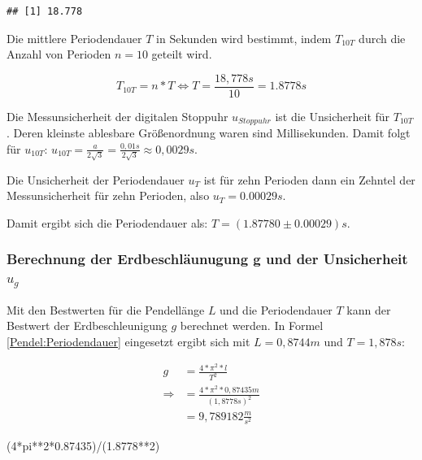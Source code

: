 \documentclass[
  9pt,
]{article}
\newenvironment{Shaded}{\begin{snugshade}}{\end{snugshade}}
\newcommand{\DecValTok}[1]{\textcolor[rgb]{0.00,0.00,0.81}{#1}}
\newcommand{\FloatTok}[1]{\textcolor[rgb]{0.00,0.00,0.81}{#1}}
\newcommand{\NormalTok}[1]{#1}
\newcommand{\SpecialCharTok}[1]{\textcolor[rgb]{0.00,0.00,0.00}{#1}}
\begin{document}
\begin{verbatim}
## [1] 18.778
\end{verbatim}

Die mittlere Periodendauer \(T\) in Sekunden wird bestimmt, indem
\(T_{10T}\) durch die Anzahl von Perioden \(n=10\) geteilt wird.

\[T_{10T} = n*T \Leftrightarrow T = \frac{18,778s}{10}=1.8778s\]

Die Messunsicherheit der digitalen Stoppuhr \(u_{Stoppuhr}\) ist die
Unsicherheit für \(T_{10T}\). Deren kleinste ablesbare Größenordnung
waren sind Millisekunden. Damit folgt für \(u_{10T}\):
\(u_{10T}= \frac{a}{2\sqrt{3}} = \frac{0,01s}{2\sqrt{3}} \approx 0,0029s\).

Die Unsicherheit der Periodendauer \(u_T\) ist für zehn Perioden dann
ein Zehntel der Messunsicherheit für zehn Perioden, also
\(u_T=0.00029s\).

Damit ergibt sich die Periodendauer als: \(T=(1.87780 \pm 0.00029)s\).

\hypertarget{berechnung-der-erdbeschluxe4unugung-g-und-der-unsicherheit-u_g}{%
\subsubsection{\texorpdfstring{Berechnung der Erdbeschläunugung g und
der Unsicherheit
\(u_g\)}{Berechnung der Erdbeschläunugung g und der Unsicherheit u\_g}}\label{berechnung-der-erdbeschluxe4unugung-g-und-der-unsicherheit-u_g}}

Mit den Bestwerten für die Pendellänge \(L\) und die Periodendauer \(T\)
kann der Bestwert der Erdbeschleunigung \(g\) berechnet werden. In
Formel \ref{Pendel:Periodendauer} eingesetzt ergibt sich mit
\(L = 0,8744m\) und \(T = 1,878s\):

\begin{equation*}
\begin{split}
g&=\frac{4*\pi^2*l}{T^2}\\
\Rightarrow &=\frac{4*\pi^2*0,87435m}{(1,8778s)^2}\\
 &= 9,789182 \frac{m}{s^2} 
\end{split}
\end{equation*}

\begin{Shaded}
\begin{Highlighting}[]
\NormalTok{(}\DecValTok{4}\SpecialCharTok{*}\NormalTok{pi}\SpecialCharTok{**}\DecValTok{2}\SpecialCharTok{*}\FloatTok{0.87435}\NormalTok{)}\SpecialCharTok{/}\NormalTok{(}\FloatTok{1.8778}\SpecialCharTok{**}\DecValTok{2}\NormalTok{)}
\end{Highlighting}
\end{Shaded}
\end{document}
